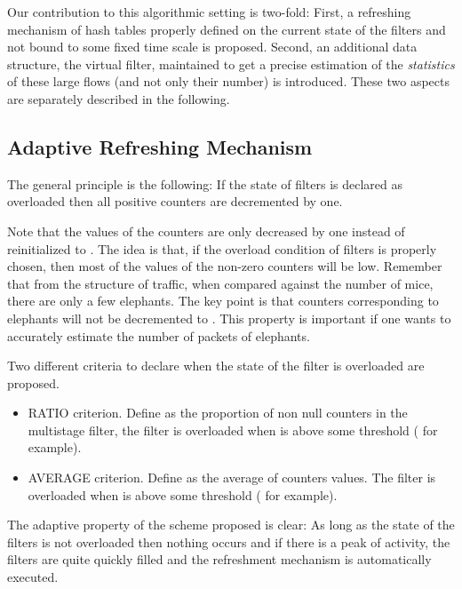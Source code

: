 \documentclass{amsart}
\begin{document}
Our contribution to this algorithmic setting is two-fold: First, a refreshing mechanism of
hash tables  properly defined on the  current state of the  filters and not  bound to some
fixed time scale is proposed.  Second, an additional data structure,  the virtual filter, maintained
to get  a precise estimation  of the {\em  statistics} of these  large flows (and  not only
their number) is introduced.  These two aspects are  separately described in the following.

\subsection{Adaptive Refreshing Mechanism}
The general principle is the following: If the state of filters is declared as overloaded
then all positive counters are decremented by one.  

Note that  the values of the counters are only decreased by one
instead of reinitialized to
. The idea is that, if the overload condition of  filters is properly chosen, then most of the
values of the non-zero counters will be low. Remember that from the structure of traffic, when compared
against  the number of mice, there are only a  few elephants. The key point  is that counters
corresponding to elephants will not be decremented  to . This property is important if one wants to
accurately estimate the number of packets of elephants.
 
Two different criteria to declare when the state of the filter is overloaded are proposed. 
\begin{itemize}	
		\item RATIO criterion.  Define  as the proportion of non null counters in the multistage
                  filter,  the filter is overloaded when  is above some  threshold 
                  ( for example). 
		\item AVERAGE criterion. Define   as the average of counters values. The filter  is overloaded
                  when   is above some  threshold  ( for example). 
\end{itemize}
The adaptive property of the scheme proposed is clear: As long as the state of the filters
is not overloaded then nothing occurs and if there is a peak of activity,  the
filters are quite quickly filled and the refreshment mechanism is automatically executed. 
\end{document}
